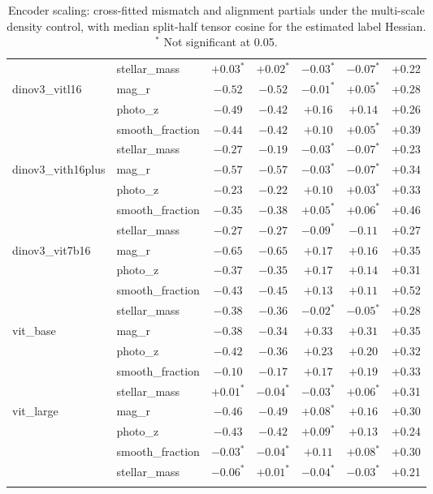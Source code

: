 \begin{table}[h]
\begin{tabular}{llccccc}
 & stellar\_mass & $+0.03^{*}$ & $+0.02^{*}$ & $-0.03^{*}$ & $-0.07^{*}$ & +0.22 \\
\addlinespace[2pt]
dinov3\_vitl16 & mag\_r & $-0.52$ & $-0.52$ & $-0.01^{*}$ & $+0.05^{*}$ & +0.28 \\
 & photo\_z & $-0.49$ & $-0.42$ & $+0.16$ & $+0.14$ & +0.26 \\
 & smooth\_fraction & $-0.44$ & $-0.42$ & $+0.10$ & $+0.05^{*}$ & +0.39 \\
 & stellar\_mass & $-0.27$ & $-0.19$ & $-0.03^{*}$ & $-0.07^{*}$ & +0.23 \\
\addlinespace[2pt]
dinov3\_vith16plus & mag\_r & $-0.57$ & $-0.57$ & $-0.03^{*}$ & $-0.07^{*}$ & +0.34 \\
 & photo\_z & $-0.23$ & $-0.22$ & $+0.10$ & $+0.03^{*}$ & +0.33 \\
 & smooth\_fraction & $-0.35$ & $-0.38$ & $+0.05^{*}$ & $+0.06^{*}$ & +0.46 \\
 & stellar\_mass & $-0.27$ & $-0.27$ & $-0.09^{*}$ & $-0.11$ & +0.27 \\
\addlinespace[2pt]
dinov3\_vit7b16 & mag\_r & $-0.65$ & $-0.65$ & $+0.17$ & $+0.16$ & +0.35 \\
 & photo\_z & $-0.37$ & $-0.35$ & $+0.17$ & $+0.14$ & +0.31 \\
 & smooth\_fraction & $-0.43$ & $-0.45$ & $+0.13$ & $+0.11$ & +0.52 \\
 & stellar\_mass & $-0.38$ & $-0.36$ & $-0.02^{*}$ & $-0.05^{*}$ & +0.28 \\
\addlinespace[2pt]
vit\_base & mag\_r & $-0.38$ & $-0.34$ & $+0.33$ & $+0.31$ & +0.35 \\
 & photo\_z & $-0.42$ & $-0.36$ & $+0.23$ & $+0.20$ & +0.32 \\
 & smooth\_fraction & $-0.10$ & $-0.17$ & $+0.17$ & $+0.19$ & +0.33 \\
 & stellar\_mass & $+0.01^{*}$ & $-0.04^{*}$ & $-0.03^{*}$ & $+0.06^{*}$ & +0.31 \\
\addlinespace[2pt]
vit\_large & mag\_r & $-0.46$ & $-0.49$ & $+0.08^{*}$ & $+0.16$ & +0.30 \\
 & photo\_z & $-0.43$ & $-0.42$ & $+0.09^{*}$ & $+0.13$ & +0.24 \\
 & smooth\_fraction & $-0.03^{*}$ & $-0.04^{*}$ & $+0.11$ & $+0.08^{*}$ & +0.30 \\
 & stellar\_mass & $-0.06^{*}$ & $+0.01^{*}$ & $-0.04^{*}$ & $-0.03^{*}$ & +0.21 \\
\addlinespace[2pt]
\bottomrule
\end{tabular}
\caption{Encoder scaling: cross-fitted mismatch and alignment partials under the multi-scale density control, with median split-half tensor cosine for the estimated label Hessian. $^{*}$ Not significant at 0.05.}
\label{tab:scaling_xfit}
\end{table}
